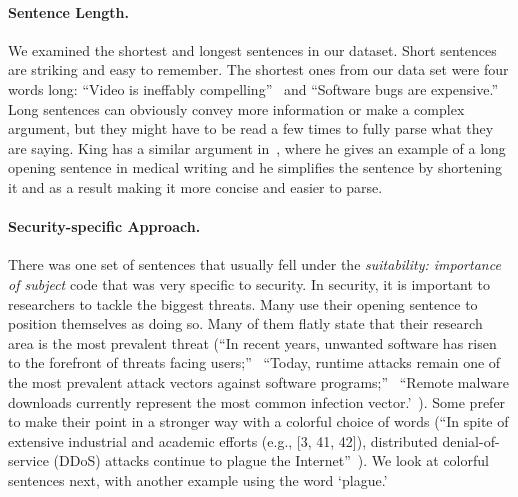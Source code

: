 \documentclass[sigconf,anonymous]{acmart}
\begin{document}
	\paragraph{Sentence Length.} We examined the shortest and longest sentences in our dataset. Short sentences are striking and easy to remember. The shortest ones from our data set were four words long: ``Video is ineffably compelling''~\cite{brocker2014iseeyou} and ``Software bugs are expensive.''~\cite{rebert2014optimizing} Long sentences can obviously convey more information or make a complex argument, but they might have to be read a few times to fully parse what they are saying. King has a similar argument in~\cite{king1967opening}, where he gives an example of a long opening sentence in medical writing and he simplifies the sentence by shortening it and as a result making it more concise and easier to parse. 
	
	\paragraph{Security-specific Approach.} There was one set of sentences that usually fell under the \textit{suitability: importance of subject} code that was very specific to security. In security, it is important to researchers to tackle the biggest threats. Many use their opening sentence to position themselves as doing so. Many of them flatly state that their research area is the most prevalent threat (``In recent years, unwanted software has risen to the forefront of threats facing users;''~\cite{thomas2016investigating} ``Today, runtime attacks remain one of the most prevalent attack vectors against software programs;''~\cite{davi2014stitching} ``Remote malware downloads currently represent the most common infection vector.'~\cite{nelms2015webwitness}). Some prefer to make their point in a stronger way with a colorful choice of words (``In spite of extensive industrial and academic efforts (e.g., [3, 41, 42]), distributed denial-of-service (DDoS) attacks continue to plague the Internet''~\cite{fayaz2015bohatei}). We look at colorful sentences next, with another example using the word `plague.'
	
\end{document}

